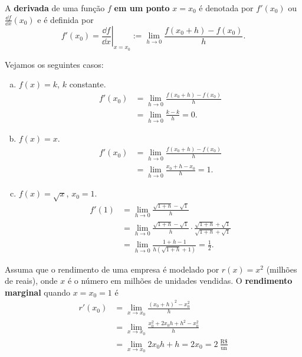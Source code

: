A {\bf derivada} de uma função $f$ {\bf em um ponto} $x=x_0$ é denotada por $f'(x_0)$ ou $\displaystyle \frac{\dd f}{\dd x}(x_0)$ e é definida por
\begin{equation}
  f'(x_0) = \left.\frac{\dd f}{\dd x}\right|_{x=x_0} := \lim_{h\to 0} \frac{f(x_0+h)-f(x_0)}{h}.
\end{equation}

\begin{ex}
  Vejamos os seguintes casos:
  \begin{enumerate}[a)]
  \item $f(x) = k$, $k$ constante.
    \begin{align}
      f'(x_0) &= \lim_{h\to 0} \frac{f(x_0+h)-f(x_0)}{h}\\
              &= \lim_{h\to 0} \frac{k-k}{h} = 0.
    \end{align}
  \item $f(x) = x$.
    \begin{align}
      f'(x_0) &= \lim_{h\to 0} \frac{f(x_0+h)-f(x_0)}{h} \\
              &= \lim_{h\to 0} \frac{x_0+h-x_0}{h} = 1.
    \end{align}
  \item $f(x) = \sqrt{x}$, $x_0=1$.
    \begin{align}
      f'(1) &= \lim_{h\to 0} \frac{\sqrt{1+h}-\sqrt{1}}{h}\\
            &= \lim_{h\to 0} \frac{\sqrt{1+h}-\sqrt{1}}{h} \cdot \frac{\sqrt{1+h}+\sqrt{1}}{\sqrt{1+h}+\sqrt{1}}\\
            &= \lim_{h\to 0} \frac{1+h-1}{h(\sqrt{1+h}+1)} = \frac{1}{2}.
    \end{align}
  \end{enumerate}
\end{ex}

\begin{ex}
  Assuma que o rendimento de uma empresa é modelado por $r(x) = x^2$ (milhões de reais), onde $x$ é o número em milhões de unidades vendidas. O {\bf rendimento marginal} quando $x=x_0=1$ é
  \begin{align}
    r'(x_0) &= \lim_{x\to x_0}\frac{(x_0+h)^2-x_0^2}{h}\\
            &= \lim_{x\to x_0}\frac{x_0^2+2x_0h+h^2-x_0^2}{h}\\
            &= \lim_{x\to x_0} 2x_0h + h = 2x_0 = 2~\frac{\text{R\$}}{\text{un}}
  \end{align}
\end{ex}

